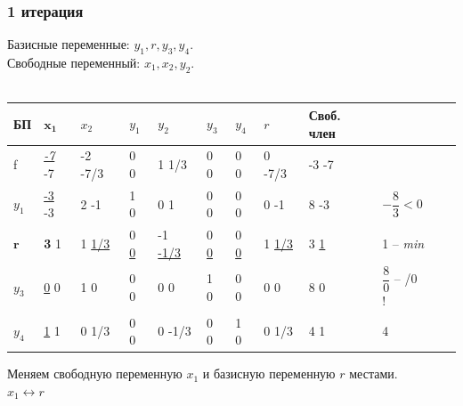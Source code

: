 \documentclass[14pt,a4paper,fleqn]{extarticle}
\begin{document}
\subsubsection*{1 итерация}
Базисные переменные: $y_1, r, y_3, y_4$.\\
Свободные переменный: $x_1, x_2, y_2$.\\\\
\begin{tabularx}{\textwidth}{|p{1cm}V{6}p{1cm}V{6}p{1cm}|p{1cm}|p{1cm}|p{1cm}|p{1cm}|p{1cm}|p{1.2cm}|c}
	\hline
	БП & $\boldsymbol{x_1}$ & $x_2$ & $y_1$ & $y_2$ & $y_3$ & $y_4$ & $r$ & Своб. член & \\
	\hline
	
	f & \underline{\textit{-7}} \scriptsize -7 & -2 \tiny -7/3 & 0 \scriptsize 0 & 1  \scriptsize 1/3 & 0 \scriptsize 0 & 0 \scriptsize 0 & 0 \tiny -7/3 & -3 \scriptsize -7 & \\
	
	\hline
	
	$y_1$ & \underline{-3} \scriptsize -3 & 2 \scriptsize -1 & 1 \scriptsize 0 & 0 \scriptsize 1 & 0 \scriptsize 0 & 0 \scriptsize 0 & 0 \scriptsize -1 & 8 \scriptsize -3 & $-\dfrac{8}{3} < 0$ \\
	
	\Xhline{6\arrayrulewidth}
	
	$\boldsymbol{r}$ & \textbf{3} \scriptsize 1 & 1 \underline{\scriptsize 1/3} & 0 \underline{\scriptsize 0} & -1 \underline{\tiny -1/3} & 0 \underline{\scriptsize 0} & 0  \underline{\scriptsize 0} & 1 \underline{\scriptsize 1/3} & 3 \underline{\scriptsize 1} & 1 -- \textit{min} \\
	
	\Xhline{6\arrayrulewidth}
	$y_3$ & \underline{0} \scriptsize 0 & 1 \scriptsize 0 & 0 \scriptsize 0 & 0 \scriptsize 0 & 1 \scriptsize 0 & 0 \scriptsize 0 & 0 \scriptsize 0 & 8 \scriptsize 0 & $\dfrac{8}{0}$ -- /0 ! \\
	\hline
	$y_4$ & \underline{1} \scriptsize 1 & 0 \scriptsize 1/3 & 0 \scriptsize 0 & 0 \scriptsize -1/3 & 0 \scriptsize 0 & 1 \scriptsize 0 & 0 \scriptsize 1/3 & 4 \scriptsize 1 & 4 \\
	\hline
\end{tabularx}
\newline\newline
Меняем свободную переменную $x_1$ и базисную переменную $r$ местами.\\
$x_1 \leftrightarrow r$
\end{document}
